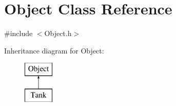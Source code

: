 \hypertarget{class_object}{
\section{Object Class Reference}
\label{class_object}
}


{\ttfamily \#include $<$Object.h$>$}

Inheritance diagram for Object:\begin{figure}[H]
\begin{center}
\leavevmode
\includegraphics[height=2.000000cm]{class_object}
\end{center}
\end{figure}
